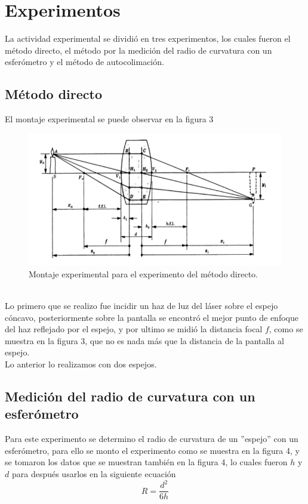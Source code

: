 \documentclass[13,twocolumn,letterpaper]{article}
\begin{document}
\section*{Experimentos}
{
	La actividad experimental se dividió en tres experimentos, los cuales fueron el método directo, el método por la medición del radio de curvatura con un esferómetro y el método de autocolimación.
\subsection{Método directo}
{
El montaje experimental se puede observar en la figura 3
\begin{figure}[h!]
	\centering
	\includegraphics[width=0.8\linewidth]{fig3}
	\caption[fig 4]{Montaje experimental para el experimento del método directo.}
	\label{fig:fig3}
\end{figure}
\\Lo primero que se realizo fue incidir un haz de luz del láser sobre el espejo cóncavo, posteriormente sobre la pantalla se encontró el mejor punto de enfoque del haz reflejado por el espejo, y por ultimo se midió la distancia focal $f$, como se muestra en la figura 3, que no es nada más que la distancia de la pantalla al espejo.\\
Lo anterior lo realizamos con dos espejos.

}
\subsection*{Medición del radio de curvatura con un esferómetro}
{
	Para este experimento se determino el radio de curvatura de un ''espejo'' con un esferómetro, para ello se monto el experimento como se muestra en la figura 4, y se tomaron los datos que se muestran también en la figura 4, lo cuales fueron $h$ y $d$ para después usarlos en la siguiente ecuación
	\begin{equation}
	R=\dfrac{d^{2}}{6h}
	\end{equation}
	
}}
\end{document}
